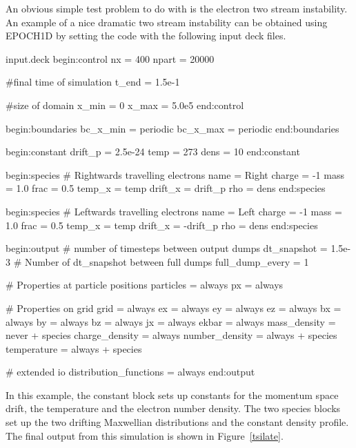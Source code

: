 An obvious simple test problem to do with {\EPOCH} is the electron two stream
instability. An example of a nice dramatic two stream instability can be
obtained using EPOCH1D by setting the code with the following input deck
files.\\
\begin{lboxverbatim}{input.deck}
begin:control
   nx = 400
   npart = 20000

   #final time of simulation
   t_end = 1.5e-1

   #size of domain
   x_min = 0
   x_max = 5.0e5
end:control


begin:boundaries
   bc_x_min = periodic
   bc_x_max = periodic
end:boundaries


begin:constant
   drift_p = 2.5e-24
   temp = 273
   dens = 10
end:constant


begin:species
   # Rightwards travelling electrons
   name = Right
   charge = -1
   mass = 1.0
   frac = 0.5
   temp_x = temp
   drift_x = drift_p
   rho = dens
end:species


begin:species
   # Leftwards travelling electrons
   name = Left
   charge = -1
   mass = 1.0
   frac = 0.5
   temp_x = temp
   drift_x = -drift_p
   rho = dens
end:species


begin:output
   # number of timesteps between output dumps
   dt_snapshot = 1.5e-3
   # Number of dt_snapshot between full dumps
   full_dump_every = 1

   # Properties at particle positions
   particles = always
   px = always

   # Properties on grid
   grid = always
   ex = always
   ey = always
   ez = always
   bx = always
   by = always
   bz = always
   jx = always
   ekbar = always
   mass_density = never + species
   charge_density = always
   number_density = always + species
   temperature = always + species

   # extended io
   distribution_functions = always
end:output
\end{lboxverbatim}


In this example, the constant block sets up constants for the momentum space
drift, the temperature and the electron number density. The two species blocks
set up the two drifting Maxwellian distributions and the constant density
profile.
The final output from this simulation is shown in Figure~\ref{tsilate}.
\pagebreak

